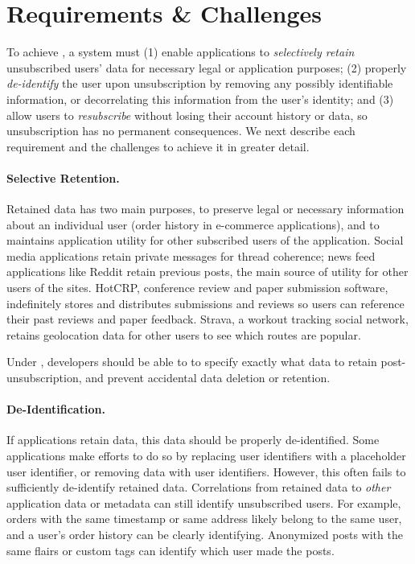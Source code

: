 \section{\name Requirements \& Challenges}

To achieve \name, a system must (1) enable applications to \emph{selectively retain} unsubscribed
users' data for necessary legal or application purposes; (2) properly \emph{de-identify} the user
upon unsubscription by removing any possibly identifiable information, or decorrelating this
information from the user's identity; and (3) allow users to \emph{resubscribe} without losing their
account history or data, so unsubscription has no permanent consequences. We next describe each
requirement and the challenges to achieve it in greater detail.

\paragraph{Selective Retention.}
Retained data has two main purposes, to preserve legal or
necessary information about an individual user (\eg order history in e-commerce applications), and
to maintains application utility for other subscribed users of the application.  Social media
applications retain private messages for thread coherence; news feed applications like Reddit retain
previous posts, the main source of utility for other users of the sites.  HotCRP, conference review
and paper submission software, indefinitely stores and distributes submissions and reviews so users
can reference their past reviews and paper feedback. Strava, a workout tracking social network,
retains geolocation data for other users to see which routes are popular.

Under \name, developers should be able to to specify exactly what data to retain 
post-unsubscription, and prevent accidental data deletion or retention.

\paragraph{De-Identification.}
If applications retain data, this data should be properly de-identified. 
Some applications make efforts to do so by replacing user identifiers with a placeholder user
identifier, or removing data with user identifiers. However, this often fails to sufficiently
de-identify retained data. Correlations from retained data to \emph{other} application data or
metadata can still identify unsubscribed users. For example, orders with the same
timestamp or same address likely belong to the same user, and a user's order
history can be clearly identifying. Anonymized posts with the same flairs or custom tags 
can identify which user made the posts.

